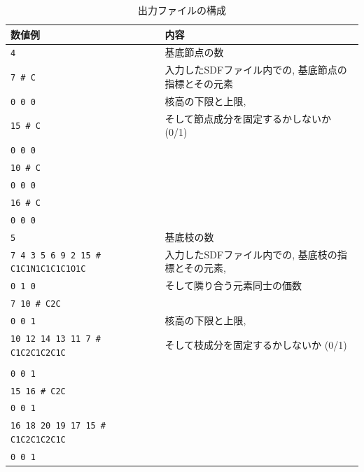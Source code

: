 \documentclass[11pt,titlepage,dvipdfmx,twoside]{jsbook}
\begin{document}
\bigskip
\begin{table}[H]
\begin{center} \caption{出力ファイルの構成}
\label{tab:PartitionFormat}
  \begin{tabular}{l|l}
  数値例 & 内容\\ \hline \hline
{\tt  4} & 基底節点の数\\ \hline
{\tt  7 \# C} & 入力したSDFファイル内での, 基底節点の指標とその元素\\
{\tt  0 0 0} & 核高の下限と上限, \\
{\tt  15 \# C} & \hspace{10mm}そして節点成分を固定するかしないか (0/1)\\
{\tt  0 0 0} & \\
{\tt  10 \# C} & \\
{\tt  0 0 0} & \\ 
{\tt  16 \# C} &\\ 
{\tt  0 0 0} & \\ \hline
{\tt  5} & 基底枝の数　\\ \hline
{\tt  7 4 3 5 6 9 2 15 \# C1C1N1C1C1C1O1C} & 入力したSDFファイル内での, 基底枝の指標とその元素,\\
{\tt  0 1 0} & \hspace{10mm}そして隣り合う元素同士の価数　\\
{\tt  7 10 \# C2C} &\\ 
{\tt  0 0 1} & 核高の下限と上限,\\
{\tt  10 12 14 13 11 7 \# C1C2C1C2C1C} & \hspace{10mm}そして枝成分を固定するかしないか (0/1)\\\\
{\tt  0 0 1} & \\
{\tt  15 16 \# C2C} & \\
{\tt  0 0 1} & \\
{\tt  16 18 20 19 17 15 \# C1C2C1C2C1C} & \\
{\tt  0 0 1} & \\ \hline
  \end{tabular}
\end{center}
\end{table}


\end{document}
